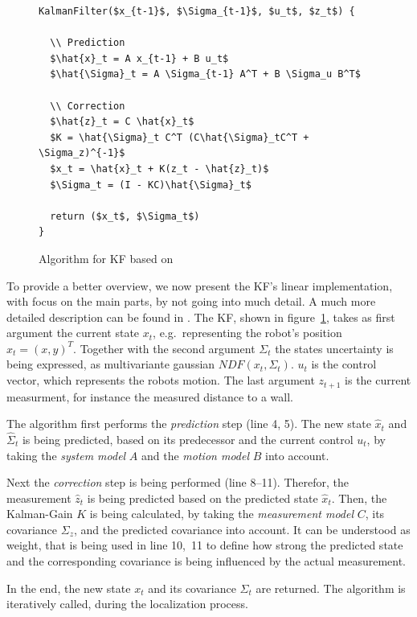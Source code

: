 \begin{figure}
\begin{lstlisting}[mathescape]
KalmanFilter($x_{t-1}$, $\Sigma_{t-1}$, $u_t$, $z_t$) {
	
  \\ Prediction
  $\hat{x}_t = A x_{t-1} + B u_t$
  $\hat{\Sigma}_t = A \Sigma_{t-1} A^T + B \Sigma_u B^T$

  \\ Correction
  $\hat{z}_t = C \hat{x}_t$
  $K = \hat{\Sigma}_t C^T (C\hat{\Sigma}_tC^T + \Sigma_z)^{-1}$
  $x_t = \hat{x}_t + K(z_t - \hat{z}_t)$
  $\Sigma_t = (I - KC)\hat{\Sigma}_t$
  
  return ($x_t$, $\Sigma_t$)
}
\end{lstlisting}
\caption{Algorithm for \acl{KF} based on \citet{thrun:prob_robo}}
\label{lst:kf}
\end{figure}

To provide a better overview, we now present the \acs{KF}'s linear implementation, with focus on the main parts, by not going into much detail. A much more detailed description can be found in \citet{thrun:prob_robo}. 
The \acs{KF}, shown in figure~\ref{lst:kf}, takes as first argument the current state $x_t$, e.g.\ representing the robot's position $x_t = (x, y)^T$. Together with the second argument $\Sigma_t$ the states uncertainty is being expressed, as multivariante gaussian $NDF(x_t, \Sigma_t)$. $u_t$ is the control vector, which represents the robots motion. The last argument $z_{t+1}$ is the current measurment, for instance the measured distance to a wall.

The algorithm first performs the \emph{prediction} step (line 4, 5). The new state $\hat{x}_t$ and $\hat{\Sigma}_t$ is being predicted, based on its predecessor and the current control $u_t$, by taking the \emph{system model} $A$ and the \emph{motion model} $B$ into account.

Next the \emph{correction} step is being performed (line 8--11). Therefor, the measurement $\hat{z}_t$ is being predicted based on the predicted state $\hat{x}_t$. Then, the Kalman-Gain $K$ is being calculated, by taking the \emph{measurement model} $C$, its covariance $\Sigma_z$, and the predicted covariance into account. It can be understood as weight, that is being used in line 10,~11 to define how strong the predicted  state and the corresponding covariance is being influenced by the actual measurement.

In the end, the new state $x_t$ and its covariance $\Sigma_t$ are returned. The algorithm is iteratively called, during the localization process.

